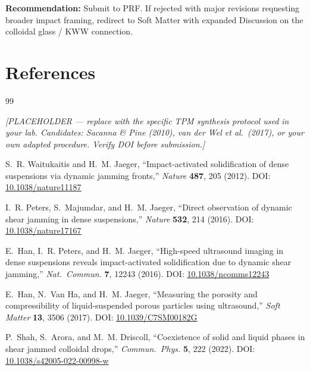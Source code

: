 \documentclass[11pt,letterpaper]{article}
\begin{document}
\textbf{Recommendation:} Submit to PRF. If rejected with major revisions
requesting broader impact framing, redirect to Soft Matter with expanded
Discussion on the colloidal glass / KWW connection.

\section*{References}

\begin{thebibliography}{99}

  \textit{[PLACEHOLDER --- replace with the specific TPM synthesis protocol
  used in your lab. Candidates: Sacanna \& Pine (2010), van der Wel et al.\
  (2017), or your own adapted procedure. Verify DOI before submission.]}

  S.~R. Waitukaitis and H.~M. Jaeger,
  ``Impact-activated solidification of dense suspensions via dynamic jamming fronts,''
  \textit{Nature} \textbf{487}, 205 (2012).
  DOI: \href{https://doi.org/10.1038/nature11187}{10.1038/nature11187}

  I.~R. Peters, S.~Majumdar, and H.~M. Jaeger,
  ``Direct observation of dynamic shear jamming in dense suspensions,''
  \textit{Nature} \textbf{532}, 214 (2016).
  DOI: \href{https://doi.org/10.1038/nature17167}{10.1038/nature17167}

  E.~Han, I.~R. Peters, and H.~M. Jaeger,
  ``High-speed ultrasound imaging in dense suspensions reveals
  impact-activated solidification due to dynamic shear jamming,''
  \textit{Nat.\ Commun.} \textbf{7}, 12243 (2016).
  DOI: \href{https://doi.org/10.1038/ncomms12243}{10.1038/ncomms12243}

  E.~Han, N.~Van Ha, and H.~M. Jaeger,
  ``Measuring the porosity and compressibility of liquid-suspended porous
  particles using ultrasound,''
  \textit{Soft Matter} \textbf{13}, 3506 (2017).
  DOI: \href{https://doi.org/10.1039/C7SM00182G}{10.1039/C7SM00182G}

  P.~Shah, S.~Arora, and M.~M. Driscoll,
  ``Coexistence of solid and liquid phases in shear jammed colloidal drops,''
  \textit{Commun.\ Phys.} \textbf{5}, 222 (2022).
  DOI: \href{https://doi.org/10.1038/s42005-022-00998-w}{10.1038/s42005-022-00998-w}


\end{thebibliography}
\end{document}
